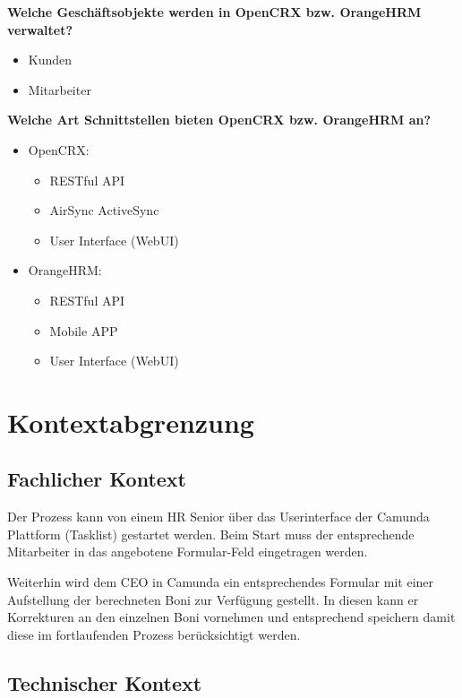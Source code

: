 \documentclass[]{article}
\begin{document}
\textbf{Welche Geschäftsobjekte werden in OpenCRX bzw. OrangeHRM verwaltet?}
\begin{itemize}
	\item Kunden
	\item Mitarbeiter
\end{itemize}
\textbf{Welche Art Schnittstellen bieten OpenCRX bzw. OrangeHRM an?}
	\begin{itemize}
	\item OpenCRX:
	\begin{itemize}
		\item RESTful API
		\item AirSync ActiveSync
		\item User Interface (WebUI)
	\end{itemize}
	\item OrangeHRM:
		\begin{itemize}
			\item RESTful API
			\item Mobile APP
			\item User Interface (WebUI)
		\end{itemize}
\end{itemize}


\hypertarget{section-system-scope-and-context}{%
\section{Kontextabgrenzung}\label{section-system-scope-and-context}}

\hypertarget{_fachlicher_kontext}{%
\subsection{Fachlicher Kontext}\label{_fachlicher_kontext}}

Der Prozess kann von einem HR Senior über das Userinterface der Camunda Plattform (Tasklist) gestartet werden. Beim Start muss der entsprechende Mitarbeiter in das angebotene Formular-Feld eingetragen werden.

Weiterhin wird dem CEO in Camunda ein entsprechendes Formular mit einer Aufstellung der berechneten Boni zur Verfügung gestellt.
In diesen kann er Korrekturen an den einzelnen Boni vornehmen und entsprechend speichern damit diese im fortlaufenden Prozess berücksichtigt werden.

\hypertarget{_technischer_kontext}{%
\subsection{Technischer Kontext}\label{_technischer_kontext}}
\end{document}
